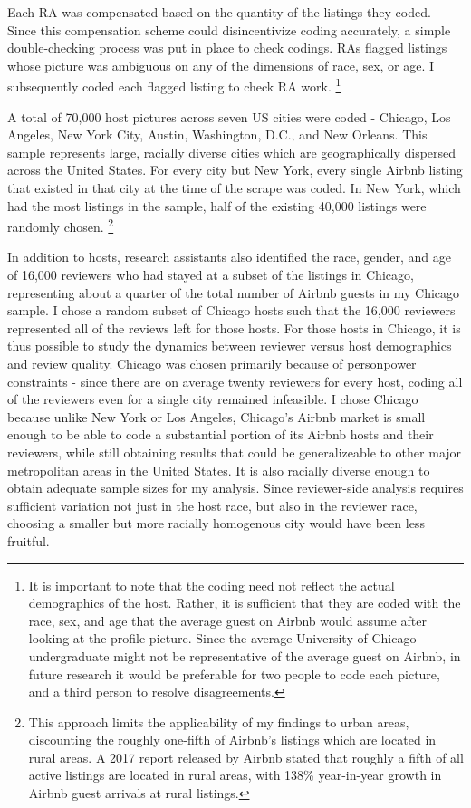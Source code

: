 Each RA was compensated based on the quantity of the listings they coded. Since this compensation scheme could disincentivize coding accurately, a simple double-checking process was put in place to check codings. RAs flagged listings whose picture was ambiguous on any of the dimensions of race, sex, or age. I subsequently coded each flagged listing to check RA work.%
	\footnote{It is important to note that the coding need not reflect the actual demographics of the host. Rather, it is sufficient that they are coded with the race, sex, and age that the average guest on Airbnb would assume after looking at the profile picture. Since the average University of Chicago undergraduate might not be representative of the average guest on Airbnb, in future research it would be preferable for two people to code each picture, and a third person to resolve disagreements.}

A total of 70,000 host pictures across seven US cities were coded - Chicago, Los Angeles, New York City, Austin, Washington, D.C., and New Orleans. This sample represents large, racially diverse cities which are geographically dispersed across the United States. For every city but New York, every single Airbnb listing that existed in that city at the time of the scrape was coded. In New York, which had the most listings in the sample, half of the existing 40,000 listings were randomly chosen.%
	\footnote{This approach limits the applicability of my findings to urban areas, discounting the roughly one-fifth of Airbnb's listings which are located in rural areas. A 2017 report released by Airbnb stated that roughly a fifth of all active listings are located in rural areas, with 138\% year-in-year growth in Airbnb guest arrivals at rural listings.} 

In addition to hosts, research assistants also identified the race, gender, and age of 16,000 reviewers who had stayed at a subset of the listings in Chicago, representing about a quarter of the total number of Airbnb guests in my Chicago sample. I chose a random subset of Chicago hosts such that the 16,000 reviewers represented all of the reviews left for those hosts. For those hosts in Chicago, it is thus possible to study the dynamics between reviewer versus host demographics and review quality. Chicago was chosen primarily because of personpower constraints - since there are on average twenty reviewers for every host, coding all of the reviewers even for a single city remained infeasible. I chose Chicago because unlike New York or Los Angeles, Chicago's Airbnb market is small enough to be able to code a substantial portion of its Airbnb hosts and their reviewers, while still obtaining results that could be generalizeable to other major metropolitan areas in the United States. It is also racially diverse enough to obtain adequate sample sizes for my analysis. Since reviewer-side analysis requires sufficient variation not just in the host race, but also in the reviewer race, choosing a smaller but more racially homogenous city would have been less fruitful.  

